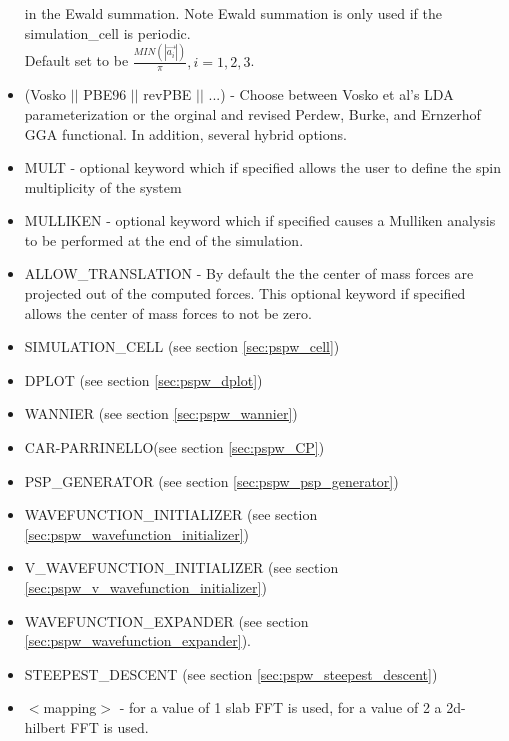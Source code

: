 \begin{itemize}
                          in the Ewald summation. Note Ewald summation
                          is only used if the simulation\_cell is periodic. \\
                           Default set to be
                          $\frac{MIN(\left| \vec{a_i} \right|)}{\pi}, i=1,2,3$.
        \item (Vosko $||$ PBE96 $||$ revPBE $||$ ...) - Choose between Vosko et al's LDA 
                               parameterization or the orginal and revised Perdew, Burke, 
                               and Ernzerhof GGA functional.  In addition, several hybrid options.
        \item MULT - optional keyword which if specified allows the user to define the spin multiplicity
                     of the system
        \item MULLIKEN - optional keyword which if specified
                         causes a Mulliken analysis to be performed at
                         the end of the simulation.  
        \item ALLOW\_TRANSLATION - By default the the center of mass forces are projected out of the 
                                  computed forces. This optional keyword if specified allows the 
                                  center of mass forces to not be zero.

        \item SIMULATION\_CELL (see section \ref{sec:pspw_cell})
        \item DPLOT (see section \ref{sec:pspw_dplot})
        \item WANNIER (see section \ref{sec:pspw_wannier})
        \item CAR-PARRINELLO(see section \ref{sec:pspw_CP})
        \item PSP\_GENERATOR (see section \ref{sec:pspw_psp_generator})
        \item WAVEFUNCTION\_INITIALIZER (see section \ref{sec:pspw_wavefunction_initializer})
        \item V\_WAVEFUNCTION\_INITIALIZER (see section \ref{sec:pspw_v_wavefunction_initializer})
        \item WAVEFUNCTION\_EXPANDER (see section \ref{sec:pspw_wavefunction_expander}).
        \item STEEPEST\_DESCENT (see section \ref{sec:pspw_steepest_descent})

        \item $<$mapping$>$ - for a value of 1 slab FFT is used, for a value of 2 a 2d-hilbert FFT is used.
\end{itemize}

